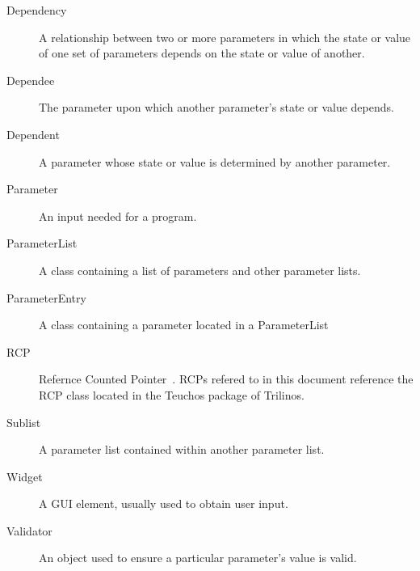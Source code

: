     \begin{description}
	\item[Dependency]
	    A relationship between two or more parameters in which the state
		or value of one set of parameters depends on the state or value of
		another.
	\item[Dependee]
		The parameter upon which another parameter's state or value depends.
	\item[Dependent]
		A parameter whose state or value is determined by another
		parameter.
	\item[Parameter]
	    An input needed for a program.
	\item[ParameterList]
	    A class containing a list of parameters and other parameter lists.
	\item[ParameterEntry]
		A class containing a parameter located in a ParameterList
	\item[RCP]
	    Refernce Counted Pointer~\cite{RCP}. RCPs refered to in this document reference the
		RCP class located in the Teuchos package of Trilinos.
	\item[Sublist]
	    A parameter list contained within another parameter list.
	\item[Widget]
		A GUI element, usually used to obtain user input.
	\item[Validator]
		An object used to ensure a particular parameter's value is valid.
    \end{description}


